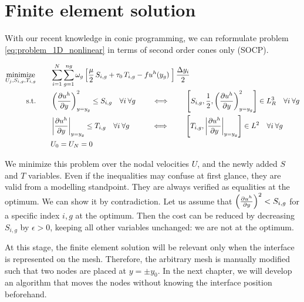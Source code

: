\documentclass[11 pt]{report}
\begin{document}
\section{Finite element solution}
\label{sec:fem_1D}
With our recent knowledge in conic programming, we can reformulate problem \eqref{eq:problem_1D_nonlinear} in terms of second order cones only (SOCP).
\begin{empheqboxed}
    \begin{equation}
        \begin{aligned}
            \operatorname*{minimize}_{U_j, S_{i, g}, T_{i, g}} \qquad &\sum_{i=1}^N \sum_{g=1}^{ng} \omega_{g} \left[\frac{\mu}{2} \, S_{i, g} + \tau_0 \, T_{i,g} - f u^h(y_g) \; \right] \frac{\Delta y_i}{2}\\
            \textrm{s.t.} \qquad & \left(\pdv{u^h}{y}\right)^2_{y=y_g} \leq S_{i,g} \quad \forall i \:\forall g \qquad \iff \qquad \left[S_{i,g}, \frac{1}{2}, \left(\pdv{u^h}{y}\right)^2_{y=y_g}\right] \in L_R^{3} \quad \forall i \:\forall g\\
            \qquad & \left|\pdv{u^h}{y}\right|_{y=y_g} \leq T_{i,g} \quad \forall i \:\forall g \qquad\;\;\: \iff \qquad \left[ T_{i,g}, \left|\pdv{u^h}{y}\right|_{y=y_g}\right] \in L^{2} \quad \forall i \:\forall g\\
            \qquad & U_0 = U_N = 0
        \end{aligned}
    \end{equation}
\end{empheqboxed}

We minimize this problem over the nodal velocities $U$, and the newly added $S$ and $T$ variables. Even if the inequalities may confuse at first glance, they are valid from a modelling standpoint. They are always verified as equalities at the optimum. We can show it by contradiction. Let us assume that $\left(\pdv{u^h}{y}\right)^2 < S_{i,g}$ for a specific index $i,g$ at the optimum. Then the cost can be reduced by decreasing $S_{i,g}$ by $\epsilon > 0$, keeping all other variables unchanged: we are not at the optimum. %

At this stage, the finite element solution will be relevant only when the interface is represented on the mesh. Therefore, the arbitrary mesh is manually modified such that two nodes are placed at $y=\pm y_0$. In the next chapter, we will develop an algorithm that moves the nodes without knowing the interface position beforehand.
\end{document}
